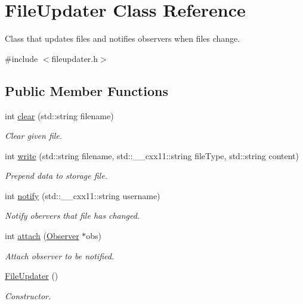 \hypertarget{classFileUpdater}{}\section{File\+Updater Class Reference}
\label{classFileUpdater}


Class that updates files and notifies observers when files change.  




{\ttfamily \#include $<$fileupdater.\+h$>$}

\subsection*{Public Member Functions}
\begin{DoxyCompactItemize}
\item 
int \mbox{\hyperlink{classFileUpdater_abee3c10c5898a48a8aeaeb374aba8b6d}{clear}} (std\+::string filename)
\begin{DoxyCompactList}\small\item\em Clear given file. \end{DoxyCompactList}\item 
int \mbox{\hyperlink{classFileUpdater_a68c2424d43c55207aa208d01f0dabc39}{write}} (std\+::string filename, std\+::\+\_\+\+\_\+cxx11\+::string file\+Type, std\+::string content)
\begin{DoxyCompactList}\small\item\em Prepend data to storage file. \end{DoxyCompactList}\item 
int \mbox{\hyperlink{classFileUpdater_af1bce94e2a92dbc223af93bb1e0d2d86}{notify}} (std\+::\+\_\+\+\_\+cxx11\+::string username)
\begin{DoxyCompactList}\small\item\em Notify obervers that file has changed. \end{DoxyCompactList}\item 
int \mbox{\hyperlink{classFileUpdater_a0f7a5affde147f2af23230f4f8133e27}{attach}} (\mbox{\hyperlink{classObserver}{Observer}} $\ast$obs)
\begin{DoxyCompactList}\small\item\em Attach observer to be notified. \end{DoxyCompactList}\item 
\mbox{\hyperlink{classFileUpdater_affee5812616d6fe3b91eff20ec2b2549}{File\+Updater}} ()
\begin{DoxyCompactList}\small\item\em Constructor. \end{DoxyCompactList}\end{DoxyCompactItemize}


